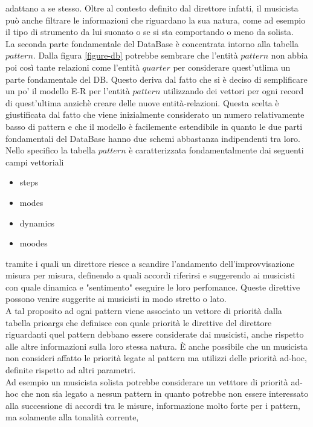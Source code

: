 adattano a se stesso. Oltre al contesto definito dal direttore infatti, il musicista
può anche filtrare le informazioni che riguardano la sua natura, come ad esempio 
il tipo di strumento da lui suonato o se si sta comportando o meno da solista.\\
La seconda parte fondamentale del DataBase è concentrata intorno alla tabella $pattern$.
Dalla figura \ref{figure-db} potrebbe sembrare che l'entità $pattern$ non abbia poi 
così tante relazioni come l'entità $quarter$ per considerare quest'utlima un parte
fondamentale del DB. Questo deriva dal fatto che si è deciso di semplificare un po'
il modello E-R per l'entità $pattern$ utilizzando dei vettori per ogni record di 
quest'ultima anzichè creare delle nuove entità-relazioni. Questa scelta è giustificata
dal fatto che viene inizialmente considerato un numero relativamente basso di pattern
e che il modello è facilemente estendibile in quanto le due parti fondamentali del 
DataBase hanno due schemi abbastanza indipendenti tra loro.\\
Nello specifico la tabella $pattern$ è caratterizzata fondamentalmente dai 
seguenti campi vettoriali
\begin{itemize}
\item steps 
\item modes 
\item dynamics
\item moodes
\end{itemize}
tramite i quali un direttore riesce a scandire l'andamento dell'improvvisazione 
misura per misura, definendo a quali accordi riferirsi e suggerendo ai musicisti 
con quale dinamica e "sentimento" eseguire le loro perfomance. Queste direttive
possono venire suggerite ai musicisti in modo stretto o lato.\\
A tal proposito ad ogni pattern viene associato un vettore di priorità dalla tabella 
prioargs che definisce con quale priorità le direttive del direttore riguardanti quel 
pattern debbano essere considerate dai musicisti, anche rispetto alle altre 
informazioni sulla loro stessa natura. È anche possibile che un musicista non consideri
affatto le priorità legate al pattern ma utilizzi delle priorità ad-hoc, definite 
rispetto ad altri parametri.\\
Ad esempio un musicista solista potrebbe considerare un vetttore di priorità 
ad-hoc che non sia legato a nessun pattern in quanto 
potrebbe non essere interessato alla successione di accordi tra le misure, 
informazione molto forte per i pattern, ma solamente alla tonalità corrente, 

